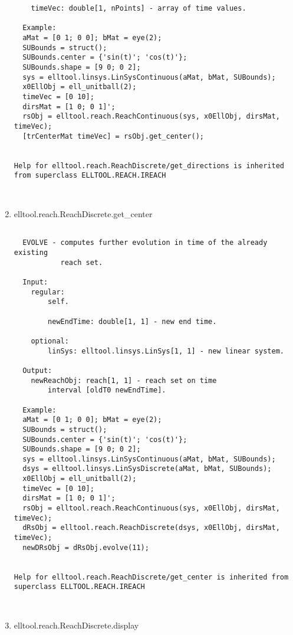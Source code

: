 \begin{enumerate}
\begin{lstlisting}
    timeVec: double[1, nPoints] - array of time values.

  Example:
  aMat = [0 1; 0 0]; bMat = eye(2);
  SUBounds = struct();
  SUBounds.center = {'sin(t)'; 'cos(t)'};
  SUBounds.shape = [9 0; 0 2];
  sys = elltool.linsys.LinSysContinuous(aMat, bMat, SUBounds);
  x0EllObj = ell_unitball(2);
  timeVec = [0 10];
  dirsMat = [1 0; 0 1]';
  rsObj = elltool.reach.ReachContinuous(sys, x0EllObj, dirsMat, timeVec);
  [trCenterMat timeVec] = rsObj.get_center();


Help for elltool.reach.ReachDiscrete/get_directions is inherited from superclass ELLTOOL.REACH.IREACH



\end{lstlisting}
\fontfamily{\familydefault}
\selectfont
\item {elltool.reach.ReachDiscrete.get\_center}
\selectfont
\begin{lstlisting}

  EVOLVE - computes further evolution in time of the already existing
           reach set.

  Input:
    regular:
        self.

        newEndTime: double[1, 1] - new end time.

    optional:
        linSys: elltool.linsys.LinSys[1, 1] - new linear system.

  Output:
    newReachObj: reach[1, 1] - reach set on time
        interval [oldT0 newEndTime].

  Example:
  aMat = [0 1; 0 0]; bMat = eye(2);
  SUBounds = struct();
  SUBounds.center = {'sin(t)'; 'cos(t)'};
  SUBounds.shape = [9 0; 0 2];
  sys = elltool.linsys.LinSysContinuous(aMat, bMat, SUBounds);
  dsys = elltool.linsys.LinSysDiscrete(aMat, bMat, SUBounds);
  x0EllObj = ell_unitball(2);
  timeVec = [0 10];
  dirsMat = [1 0; 0 1]';
  rsObj = elltool.reach.ReachContinuous(sys, x0EllObj, dirsMat, timeVec);
  dRsObj = elltool.reach.ReachDiscrete(dsys, x0EllObj, dirsMat, timeVec);
  newDRsObj = dRsObj.evolve(11);


Help for elltool.reach.ReachDiscrete/get_center is inherited from superclass ELLTOOL.REACH.IREACH



\end{lstlisting}
\fontfamily{\familydefault}
\selectfont
\item {elltool.reach.ReachDiscrete.display}
\selectfont
\begin{lstlisting}


\end{lstlisting}
\end{enumerate}
